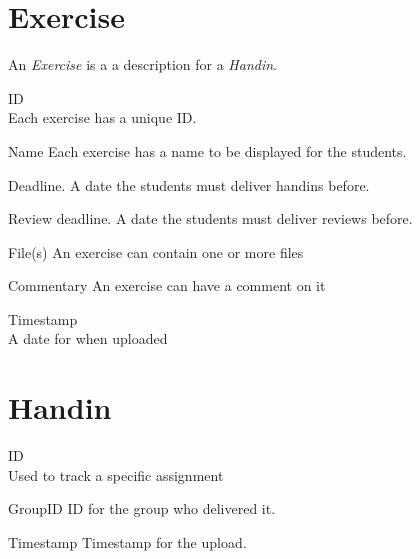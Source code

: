 \documentclass[Main]{subfiles}
\begin{document}

\section{Exercise}
An \textit{Exercise} is a a description for a \textit{Handin}.
\begin{DataIntro}
\rExample{}
\end{DataIntro}

\newpage
\begin{DataTable}

\Record
{ID\\
Each exercise has a unique ID.}
{}
{}

\Record
{Name}
{Each exercise has a name to be displayed for the students.}
{}

\Record
{Deadline.}
{A date the students must deliver handins before.}
{}

\Record
{Review deadline.}
{A date the students must deliver reviews before.}
{}

\Record
{File(s)}
{An exercise can contain one or more files}
{}


\Record
{Commentary}
{An exercise can have a comment on it}
{}


\Record
{Timestamp\\}
{A date for when uploaded}
{}
\end{DataTable}







\section{Handin}

	
\begin{DataIntro}
\rExample{}
\end{DataIntro}

\begin{DataTable}

\Record
{ID\\
Used to track a specific assignment}
{}
{}

\Record
{GroupID}
{ID for the group who delivered it.}
{}


\Record
{Timestamp}
{Timestamp for the upload.}
{}
\end{DataTable}
\end{document}
